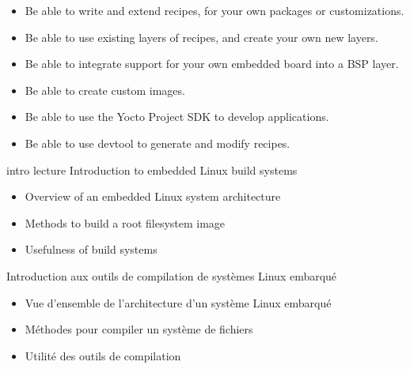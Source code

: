 {{\begin{itemize}
    \item Be able to write and extend recipes, for your own packages or
      customizations.
    \item Be able to use existing layers of recipes, and create your own
      new layers.
    \item Be able to integrate support for your own embedded board into
      a BSP layer.
    \item Be able to create custom images.
    \item Be able to use the Yocto Project SDK to develop applications.
    \item Be able to use devtool to generate and modify recipes.
    \end{itemize}
  }
}

\def \agendaboards{stm32mp1,beagleboneblack,beagleplay,imx93-frdm}

\def \trainingprerequisites{
  \begin{itemize}
    \prerequisitecommandline
    \prerequisiteembeddedlinux
    \prerequisiteenglish
  \end{itemize}
}


\def \trainers {alexandre-belloni,antonin-godard,jeremie-dautheribes,joaomarcos-costa,kamel-bouhara,luca-ceresoli}

\def \onsitelecturetimeratio{40}
\def \onsitelabtimeratio{60}


{intro}
{lecture}
{Introduction to embedded Linux build systems}
{
  \begin{itemize}
  \item Overview of an embedded Linux system architecture
  \item Methods to build a root filesystem image
  \item Usefulness of build systems
  \end{itemize}
}
{Introduction aux outils de compilation de systèmes Linux embarqué}
{
  \begin{itemize}
  \item Vue d'ensemble de l'architecture d'un système Linux embarqué
  \item Méthodes pour compiler un système de fichiers
  \item Utilité des outils de compilation
  \end{itemize}
}

